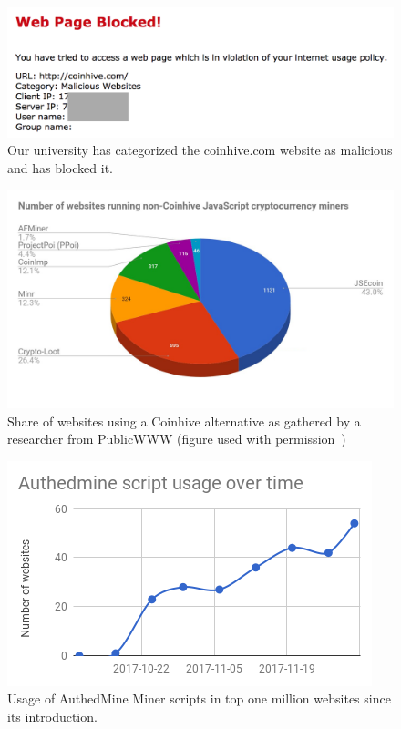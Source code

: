 \begin{figure}[t]
\centering
\includegraphics[width=0.9\linewidth]{figures/coinhive_blocked.png}
\caption{Our university has categorized the coinhive.com website as malicious and has blocked it.\label{fig:concordia}}
\end{figure}

\begin{figure}[t]
\centering
\includegraphics[width=0.9\linewidth]{figures/non-coinhive-miners.png}
\caption{Share of websites using a Coinhive alternative as gathered by a researcher from PublicWWW (figure used with permission~\cite{badpacketspublicwww})\label{fig:copycat}}
\end{figure}

\begin{figure}[t]
\centering
\includegraphics[width=0.9\linewidth]{figures/usage_of_authedmine_over_time.png}
	\caption{Usage of AuthedMine Miner scripts in top one million websites since its introduction.\label{fig:authmine}}
\end{figure}

